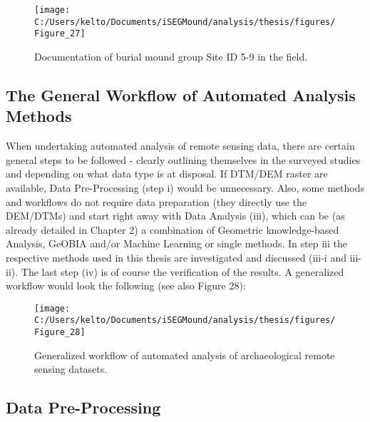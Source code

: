 \documentclass[
  12pt,
]{article}
\begin{document}
\begin{figure}

{\centering \texttt{[image: C:/Users/kelto/Documents/iSEGMound/analysis/thesis/figures/Figure\_27]} 

}

\caption{Documentation of burial mound group Site ID 5-9 in the field.}\label{fig:Figure27}
\end{figure}

\hypertarget{the-general-workflow-of-automated-analysis-methods}{%
\subsection{\texorpdfstring{\textbf{The General Workflow of Automated Analysis Methods}}{The General Workflow of Automated Analysis Methods}}\label{the-general-workflow-of-automated-analysis-methods}}

When undertaking automated analysis of remote sensing data, there are certain general steps to be followed - clearly outlining themselves in the surveyed studies and depending on what data type is at disposal. If DTM/DEM raster are available, Data Pre-Processing (step i) would be unnecessary. Also, some methods and workflows do not require data preparation (they directly use the DEM/DTMs) and start right away with Data Analysis (iii), which can be (as already detailed in Chapter 2) a combination of Geometric knowledge-based Analysis, GeOBIA and/or Machine Learning or single methods. In step iii the respective methods used in this thesis are investigated and discussed (iii-i and iii-ii). The last step (iv) is of course the verification of the results. A generalized workflow would look the following (see also Figure 28):

\begin{figure}

{\centering \texttt{[image: C:/Users/kelto/Documents/iSEGMound/analysis/thesis/figures/Figure\_28]} 

}

\caption{Generalized workflow of automated analysis of archaeological remote sensing datasets.}\label{fig:Figure28}
\end{figure}

\hypertarget{data-pre-processing}{%
\subsection{\texorpdfstring{\textbf{Data Pre-Processing}}{Data Pre-Processing}}\label{data-pre-processing}}
\end{document}
